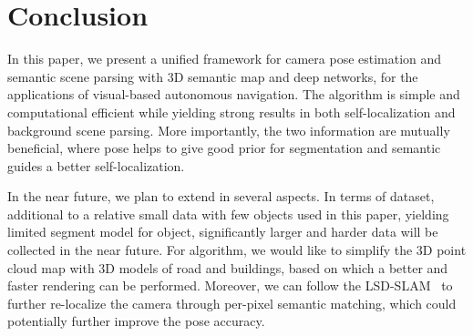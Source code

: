 \documentclass[10pt,twocolumn,letterpaper]{article}
\begin{document}







\section{Conclusion}
\label{sec:conclusion}
In this paper, we present a unified framework for camera pose estimation and semantic scene parsing with 3D semantic map and deep networks, for the applications of visual-based autonomous navigation. The algorithm is simple and computational efficient while yielding strong results in both self-localization and background scene parsing. More importantly, the two information are mutually beneficial, where pose helps to give good prior for segmentation and semantic guides a better self-localization.

In the near future, we plan to extend in several aspects. In terms of dataset, additional to a relative small data with few objects used in this paper, yielding limited segment model for object, significantly larger and harder data will be collected in the near future.
For algorithm, we would like to simplify the 3D point cloud map with 3D models of road and buildings, based on which a better and faster rendering can be performed.
Moreover, we can follow the LSD-SLAM~\cite{engel2014lsd} to further re-localize the camera through per-pixel semantic matching, which could potentially further improve the pose accuracy.


{\small


}
\end{document}
